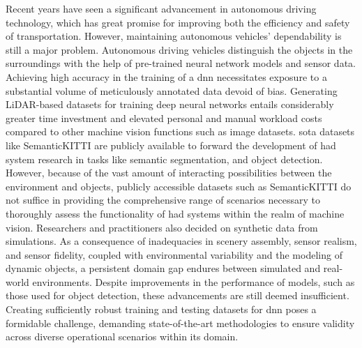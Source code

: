Recent years have seen a significant advancement in autonomous driving technology, which has great promise for improving both the efficiency and safety of transportation. However, maintaining autonomous vehicles' dependability is still a major problem. Autonomous driving vehicles distinguish the objects in the surroundings with the help of pre-trained neural network models and sensor data. Achieving high accuracy in the training of a \acrfull{dnn} necessitates exposure to a substantial volume of meticulously annotated data devoid of bias. Generating LiDAR-based datasets for training deep neural networks entails considerably greater time investment and elevated personal and manual workload costs compared to other machine vision functions such as image datasets. \acrshort{sota} datasets like SemanticKITTI are publicly available to forward the development of \acrfull{had} system research in tasks like semantic segmentation, and object detection. However, because of the vast amount of interacting possibilities between the environment and objects, publicly accessible datasets such as SemanticKITTI do not suffice in providing the comprehensive range of scenarios necessary to thoroughly assess the functionality of \acrfull{had} systems within the realm of machine vision. Researchers and practitioners also decided on synthetic data from simulations. As a consequence of inadequacies in scenery assembly, sensor realism, and sensor fidelity, coupled with environmental variability and the modeling of dynamic objects, a persistent domain gap endures between simulated and real-world environments. Despite improvements in the performance of models, such as those used for object detection, these advancements are still deemed insufficient. Creating sufficiently robust training and testing datasets for \acrshort{dnn} poses a formidable challenge, demanding state-of-the-art methodologies to ensure validity across diverse operational scenarios within its domain.

